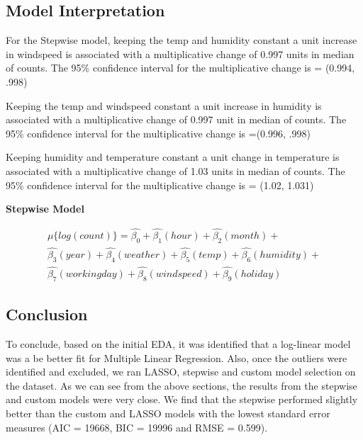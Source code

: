 \documentclass[american,]{article}
\begin{document}
\newpage

\hypertarget{model-interpretation}{%
\subsection{Model Interpretation}\label{model-interpretation}}

For the Stepwise model, keeping the temp and humidity constant a unit increase in windspeed is associated with a multiplicative change of 0.997 units in median of counts. The 95\% confidence interval for the multiplicative change is = (0.994, .998)

Keeping the temp and windspeed constant a unit increase in humidity is associated with a multiplicative change of 0.997 unit in median of counts. The 95\% confidence interval for the multiplicative change is =(0.996, .998)

Keeping humidity and temperature constant a unit change in temperature is associated with a multiplicative change of 1.03 units in median of counts. The 95\% confidence interval for the multiplicative change is = (1.02, 1.031)

\textbf{Stepwise Model}

\begin{align}
\mu \lbrace log(count) \rbrace = \hat{\beta_0} + \hat{\beta_1} (hour) +  \hat{\beta_2} (month) + 
\nonumber\\
\hat{\beta_3} (year) + \hat{\beta_4} (weather) +  \hat{\beta_5} (temp) + \hat{\beta_6} (humidity) +
\nonumber\\
\hat{\beta_7} (workingday) +  \hat{\beta_8} (windspeed) + \hat{\beta_9} (holiday)\label{eq:Stepwise}
\end{align}

\hypertarget{conclusion}{%
\subsection{Conclusion}\label{conclusion}}

To conclude, based on the initial EDA, it was identified that a log-linear model was a be better fit for Multiple Linear Regression. Also, once the outliers were identified and excluded, we ran LASSO, stepwise and custom model selection on the dataset. As we can see from the above sections, the results from the stepwise and custom models were very close. We find that the stepwise performed slightly better than the custom and LASSO models with the lowest standard error measures (AIC = 19668, BIC = 19996 and RMSE = 0.599).
\end{document}
